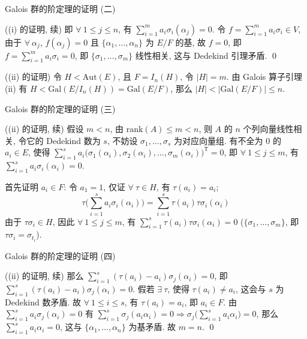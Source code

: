 \begin{frame}{Galois 群的阶定理的证明 (二)}

\startproof[bg=yellow, fg=red]((i) 的证明, 续)
即 $\forall\ 1 \leq j \leq n$, 有 $\sum_{i=1}^{m} a_i \sigma_i(\alpha_j) = 0$.
令 $f = \sum_{i=1}^{m} a_i \sigma_i \in V$,
由于 $\forall\ \alpha_j$, $f(\alpha_j) = 0$ 且
$\{ \alpha_1, \dots, \alpha_n \}$ 为 $E/F$ 的基,
故 $f = 0$, 即 $f = \sum_{i=1}^{m} a_i \sigma_i = 0$,
即 $\{ \sigma_1, \dots, \sigma_m \}$ 线性相关,
这与 Dedekind 引理矛盾.
\qed

\pause

\startproof[bg=yellow, fg=red]((ii) 的证明)
令 $H < \mathrm{Aut}(E)$, 且 $F = I_n(H)$, 令 $|H| = m$.
由 Galois 算子引理 (ii) 有 $H < \mathrm{Gal}(E/I_n(H)) = \mathrm{Gal}(E/F)$,
那么 $|H| < |\mathrm{Gal}(E/F)| \leq n$.

\end{frame}


\begin{frame}{Galois 群的阶定理的证明 (三)}

\startproof[bg=yellow, fg=red]((ii) 的证明, 续)
假设 $m < n$, 由 $\mathrm{rank}(A) \leq m < n$,
则 $A$ 的 $n$ 个列向量线性相关,
令它的 Dedekind 数为 $s$, 不妨设 $\sigma_1, \dots, \sigma_s$ 为对应向量组.
有不全为 $0$ 的 $a_i \in E$,
使得 $\sum_{i=1}^{s} a_i \big( \sigma_1(\alpha_i), \sigma_2(\alpha_i), \dots, \sigma_m(\alpha_i) \big)^{\mathsf{T}} = 0$,
即 $\forall\ 1 \leq j \leq m$, 有 $\sum_{i=1}^{s} a_i \sigma_i(\alpha_i) = 0$.

首先证明 $a_i \in F$:
令 $a_1 = 1$, 仅证 $\forall\ \tau \in H$, 有 $\tau(a_i) = a_i$;
\[
\tau\Big( \sum_{i=1}^{s} a_i \sigma_i(\alpha_i) \Big)
= \sum_{i=1}^{s} \tau(a_i) \tau\sigma_i(\alpha_i)
\]
由于 $\tau\sigma_i \in H$, 因此 $\forall\ 1 \leq j \leq m$,
有 $\sum_{i=1}^{s} \tau(a_i) \tau\sigma_i(\alpha_i) = 0$
($\{ \sigma_1, \dots, \sigma_m \}$, 即 $\tau\sigma_i = \sigma_{t_i}$).

\end{frame}


\begin{frame}{Galois 群的阶定理的证明 (四)}

\startproof[bg=yellow, fg=red]((ii) 的证明, 续)
那么 $\sum_{i=1}^{s} (\tau(a_i) - a_i) \sigma_j(\alpha_i) = 0$,
即 $\sum_{i=1}^{s} (\tau(a_i) - a_i) \sigma_j(\alpha_i) = 0$.
假若 $\exists\ \tau$, 使得 $\tau(a_i) \neq a_i$,
这会与 $s$ 为 Dedekind 数矛盾.
故 $\forall\ 1 \leq i \leq s$, 有 $\tau(a_i) = a_i$, 即 $a_i \in F$.
由 $\sum_{i=1}^{s} a_i \sigma_j(\alpha_i) = 0$
有 $\sum_{i=1}^{s} \sigma_j(a_i \alpha_i) = 0
\Longrightarrow \sigma_j\Big( \sum_{i=1}^{s} a_i \alpha_i \Big) = 0$,
那么 $\sum_{i=1}^{s} a_i \alpha_i = 0$,
这与 $\{ \alpha_1, \dots, \alpha_n \}$ 为基矛盾.
故 $m = n$.
\qed

\end{frame}


